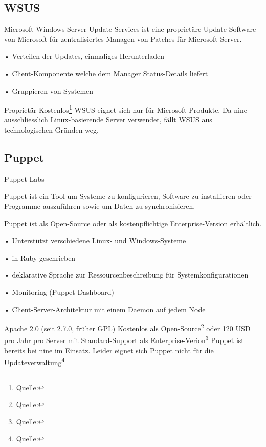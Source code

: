 \subsection*{WSUS}

{Microsoft}
{Windows Server Update Services ist eine proprietäre Update-Software von Microsoft für zentralisiertes Managen von Patches für Microsoft-Server.}
{
• Verteilen der Updates, einmaliges Herunterladen

• Client-Komponente welche dem Manager Status-Details liefert

• Gruppieren von Systemen
}
{Proprietär}
{Kostenlos\footnote{Quelle: }}
{}
{WSUS eignet sich nur für Microsoft-Produkte. Da \gls{nine} ausschliesslich Linux-basierende Server verwendet, fällt WSUS aus technologischen Gründen weg.}

\subsection*{Puppet}

{Puppet Labs}
{Puppet ist ein Tool um Systeme zu konfigurieren, Software zu installieren oder Programme auszuführen sowie um Daten zu synchronisieren.

Puppet ist als Open-Source oder als kostenpflichtige Enterprise-Version erhältlich. }
{
• Unterstützt verschiedene Linux- und Windows-Systeme

• in Ruby geschrieben

• deklarative Sprache zur Ressourcenbeschreibung für Systemkonfigurationen

• Monitoring (Puppet Dashboard)

• Client-Server-Architektur mit einem Daemon auf jedem Node
}
{Apache 2.0 (seit 2.7.0, früher GPL)}
{Kostenlos als Open-Source\footnote{Quelle: } oder 120 USD pro Jahr pro Server mit Standard-Support als Enterprise-Verion\footnote{Quelle: }}
{}
{Puppet ist bereits bei \gls{nine} im Einsatz. Leider eignet sich Puppet nicht für die Updateverwaltung\footnote{Quelle: }}
